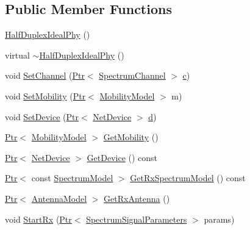 \subsection*{Public Member Functions}
\begin{DoxyCompactItemize}
\item 
\hyperlink{classns3_1_1HalfDuplexIdealPhy_ae2c8e7505a1e3850f9bef6517c22a614}{Half\+Duplex\+Ideal\+Phy} ()
\item 
virtual \hyperlink{classns3_1_1HalfDuplexIdealPhy_ac2cf8503d42dbbcf2ba1a75c6ffa9ae2}{$\sim$\+Half\+Duplex\+Ideal\+Phy} ()
\item 
void \hyperlink{classns3_1_1HalfDuplexIdealPhy_af695db46f5f77d794682662ee6ee3365}{Set\+Channel} (\hyperlink{classns3_1_1Ptr}{Ptr}$<$ \hyperlink{classns3_1_1SpectrumChannel}{Spectrum\+Channel} $>$ \hyperlink{mmwave_2model_2fading-traces_2fading__trace__generator_8m_ae0323a9039add2978bf5b49550572c7c}{c})
\item 
void \hyperlink{classns3_1_1HalfDuplexIdealPhy_a37ebb543c70a37052d9a78821d0a8e79}{Set\+Mobility} (\hyperlink{classns3_1_1Ptr}{Ptr}$<$ \hyperlink{classns3_1_1MobilityModel}{Mobility\+Model} $>$ m)
\item 
void \hyperlink{classns3_1_1HalfDuplexIdealPhy_ac72f158473c7849e4186ef8d151250a8}{Set\+Device} (\hyperlink{classns3_1_1Ptr}{Ptr}$<$ \hyperlink{classns3_1_1NetDevice}{Net\+Device} $>$ \hyperlink{lte__pathloss_8m_a1aabac6d068eef6a7bad3fdf50a05cc8}{d})
\item 
\hyperlink{classns3_1_1Ptr}{Ptr}$<$ \hyperlink{classns3_1_1MobilityModel}{Mobility\+Model} $>$ \hyperlink{classns3_1_1HalfDuplexIdealPhy_a430da920ce6313abdfbc69837ca07578}{Get\+Mobility} ()
\item 
\hyperlink{classns3_1_1Ptr}{Ptr}$<$ \hyperlink{classns3_1_1NetDevice}{Net\+Device} $>$ \hyperlink{classns3_1_1HalfDuplexIdealPhy_a9350c985343e2d6563c5ec0221f7a2d9}{Get\+Device} () const 
\item 
\hyperlink{classns3_1_1Ptr}{Ptr}$<$ const \hyperlink{classns3_1_1SpectrumModel}{Spectrum\+Model} $>$ \hyperlink{classns3_1_1HalfDuplexIdealPhy_aaa27a3c3f587cf2579f0606c9502f257}{Get\+Rx\+Spectrum\+Model} () const 
\item 
\hyperlink{classns3_1_1Ptr}{Ptr}$<$ \hyperlink{classns3_1_1AntennaModel}{Antenna\+Model} $>$ \hyperlink{classns3_1_1HalfDuplexIdealPhy_ae48f67ea3100df6b37956901658e3102}{Get\+Rx\+Antenna} ()
\item 
void \hyperlink{classns3_1_1HalfDuplexIdealPhy_aa2d9a411ba82c4bbd77a2e5a0bc2657f}{Start\+Rx} (\hyperlink{classns3_1_1Ptr}{Ptr}$<$ \hyperlink{structns3_1_1SpectrumSignalParameters}{Spectrum\+Signal\+Parameters} $>$ params)

\end{DoxyCompactItemize}
